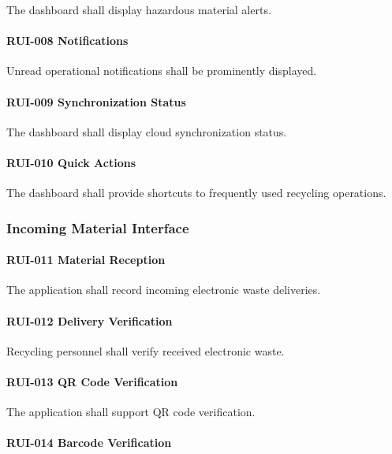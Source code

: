 The dashboard shall display hazardous material alerts.

\paragraph{RUI-008 Notifications}

Unread operational notifications shall be prominently displayed.

\paragraph{RUI-009 Synchronization Status}

The dashboard shall display cloud synchronization status.

\paragraph{RUI-010 Quick Actions}

The dashboard shall provide shortcuts to frequently used recycling
operations.


\subsubsection*{Incoming Material Interface}

\paragraph{RUI-011 Material Reception}

The application shall record incoming electronic waste deliveries.

\paragraph{RUI-012 Delivery Verification}

Recycling personnel shall verify received electronic waste.

\paragraph{RUI-013 QR Code Verification}

The application shall support QR code verification.

\paragraph{RUI-014 Barcode Verification}


